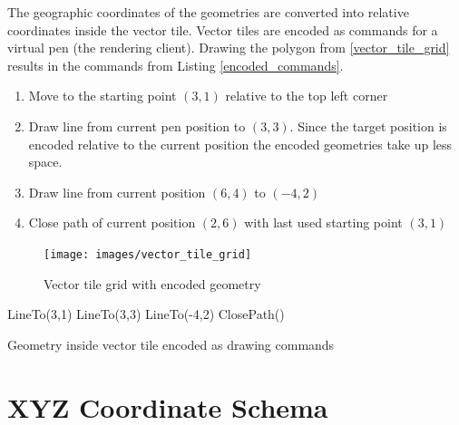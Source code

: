 \noindent\begin{minipage}[t]{0.48\linewidth}
    \vspace{0pt}
    The geographic coordinates of the geometries are converted into relative coordinates inside the vector tile.
    Vector tiles are encoded as commands for a virtual pen (the rendering client). Drawing the polygon from \autoref{vector_tile_grid} results in the commands from Listing \autoref{encoded_commands}.
    
    \begin{enumerate}
        \item Move to the starting point $(3,1)$ relative to the top left corner
        \item Draw line from current pen position to $(3,3)$. Since the target position is encoded relative to the current position the encoded geometries take up less space.
        \item Draw line from current position $(6,4)$ to $(-4,2)$ 
        \item Close path of current position $(2,6)$ with last used starting point $(3,1)$
    \end{enumerate}
\end{minipage}
\hfill
\begin{minipage}[t]{0.48\linewidth}
    \vspace{-20pt}
    \begin{figure}[H]
        \centering
        \texttt{[image: images/vector\_tile\_grid]}
        \caption{Vector tile grid with encoded geometry}
        \label{vector_tile_grid}
    \end{figure}
    \vspace{-10pt}
    \begin{listing}[H]
\begin{plpgsqlcode}
LineTo(3,1)
LineTo(3,3)
LineTo(-4,2)
ClosePath()
\end{plpgsqlcode}
        \caption{Geometry inside vector tile encoded as drawing commands}
        \label{encoded_commands}
    \end{listing}
\end{minipage}





\section{XYZ Coordinate Schema}\label{part1_xyz_coordinates}

